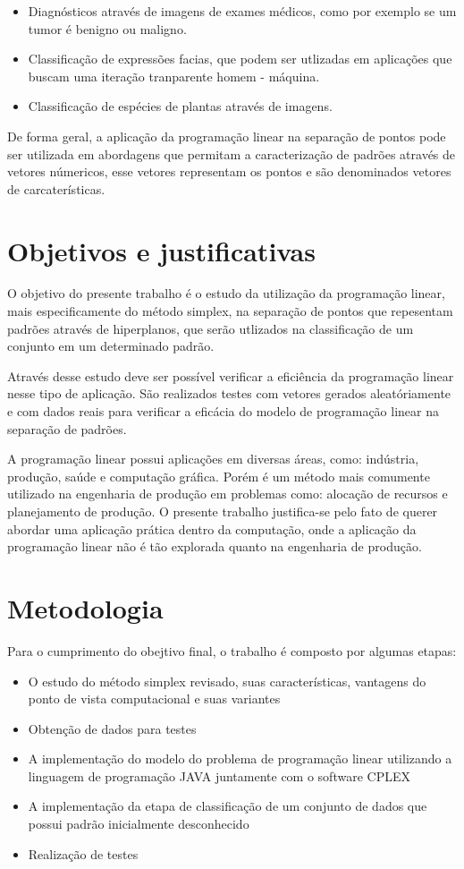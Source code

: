 \begin{itemize}
\item Diagnósticos através de imagens de exames médicos, como por exemplo se um tumor é benigno ou maligno.
\item Classificação de expressões facias, que podem ser utlizadas em aplicações que buscam uma iteração tranparente homem - máquina.
\item Classificação de espécies de plantas através de imagens.
\end{itemize}

De forma geral, a aplicação da programação linear na separação de pontos pode ser utilizada em abordagens que permitam a caracterização de padrões através de vetores númericos, esse vetores representam os pontos e são denominados vetores de carcaterísticas.

\section{Objetivos e justificativas}
O objetivo do presente trabalho é o estudo da utilização da programação linear, mais especificamente do método simplex, na separação de pontos que repesentam padrões através de hiperplanos, que serão utlizados na classificação de um conjunto em um determinado padrão. 

Através desse estudo deve ser possível verificar a eficiência da programação linear nesse tipo de aplicação. São realizados testes com vetores gerados aleatóriamente e com dados reais para verificar a eficácia do modelo de programação linear na separação de padrões.

A programação linear possui aplicações em diversas áreas, como: indústria, produção, saúde e computação gráfica. Porém é um método mais comumente utilizado na engenharia de produção em problemas como: alocação de recursos e planejamento de produção. O presente trabalho justifica-se pelo fato de querer abordar uma aplicação prática dentro da computação, onde a aplicação da programação linear não é tão explorada quanto na engenharia de produção.

\section{Metodologia}
Para o cumprimento do obejtivo final, o trabalho é composto por algumas etapas:

\begin{itemize} 
\item O estudo do método simplex revisado, suas características, vantagens do ponto de vista computacional e suas variantes
\item Obtenção de dados para testes
\item A implementação do modelo do problema de programação linear utilizando a linguagem de programação JAVA juntamente com o software CPLEX
\item A implementação da etapa de classificação de um conjunto de dados que possui padrão inicialmente desconhecido
\item Realização de testes 
\end{itemize}


